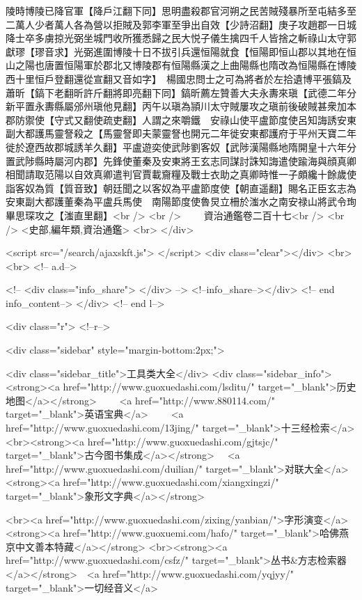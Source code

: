 陵時博陵已降官軍【降戶江翻下同】思明盡殺郡官河朔之民苦賊殘暴所至屯結多至二萬人少者萬人各為營以拒賊及郭李軍至爭出自效【少詩沼翻】庚子攻趙郡一日城降士卒多虜掠光弼坐城門收所獲悉歸之民大悦子儀生擒四千人皆捨之斬祿山太守郭獻璆【璆音求】光弼進圍博陵十日不拔引兵還恒陽就食【恒陽即恒山郡以其地在恒山之陽也唐置恒陽軍於郡北又博陵郡有恒陽縣漢之上曲陽縣也隋改為恒陽縣在博陵西十里恒戶登翻還從宣翻又音如字】　楊國忠問士之可為將者於左拾遺博平張鎬及蕭昕【鎬下老翻昕許斤翻將即亮翻下同】鎬昕薦左贊善大夫永夀來瑱【武德二年分新平置永夀縣屬邠州瑱他見翻】丙午以瑱為頴川太守賊屢攻之瑱前後破賊甚衆加本郡防禦使【守式又翻使疏吏翻】人謂之來嚼鐵　安祿山使平盧節度使呂知誨誘安東副大都護馬靈詧殺之【馬靈詧即夫蒙靈詧也開元二年徙安東都護府于平州天寶二年徙於遼西故郡城誘羊久翻】平盧遊奕使武陟劉客奴【武陟漢陽縣地隋開皇十六年分置武陟縣時屬河内郡】先鋒使董秦及安東將王玄志同謀討誅知誨遣使踰海與顔真卿相聞請取范陽以自效真卿遣判官賈載齎糧及戰士衣助之真卿時惟一子頗纔十餘歲使詣客奴為質【質音致】朝廷聞之以客奴為平盧節度使【朝直遥翻】賜名正臣玄志為安東副大都護董秦為平盧兵馬使　南陽節度使魯炅立柵於滍水之南安禄山將武令珣畢思琛攻之【滍直里翻】<br />
<br />
　　資治通鑑卷二百十七<br />
<br />
<史部,編年類,資治通鑑>  <br>
   </div> 

<script src="/search/ajaxskft.js"> </script>
 <div class="clear"></div>
<br>
<br>
 <!-- a.d-->

 <!--
<div class="info_share">
</div> 
-->
 <!--info_share--></div>   <!-- end info_content-->
  </div> <!-- end l-->

<div class="r">   <!--r-->



<div class="sidebar"  style="margin-bottom:2px;">

 
<div class="sidebar_title">工具类大全</div>
<div class="sidebar_info">
<strong><a href="http://www.guoxuedashi.com/lsditu/" target="_blank">历史地图</a></strong>　　
<a href="http://www.880114.com/" target="_blank">英语宝典</a>　　
<a href="http://www.guoxuedashi.com/13jing/" target="_blank">十三经检索</a>　
<br><strong><a href="http://www.guoxuedashi.com/gjtsjc/" target="_blank">古今图书集成</a></strong>　
<a href="http://www.guoxuedashi.com/duilian/" target="_blank">对联大全</a>　<strong><a href="http://www.guoxuedashi.com/xiangxingzi/" target="_blank">象形文字典</a></strong>　

<br><a href="http://www.guoxuedashi.com/zixing/yanbian/">字形演变</a>　　<strong><a href="http://www.guoxuemi.com/hafo/" target="_blank">哈佛燕京中文善本特藏</a></strong>
<br><strong><a href="http://www.guoxuedashi.com/csfz/" target="_blank">丛书&方志检索器</a></strong>　<a href="http://www.guoxuedashi.com/yqjyy/" target="_blank">一切经音义</a>　　

